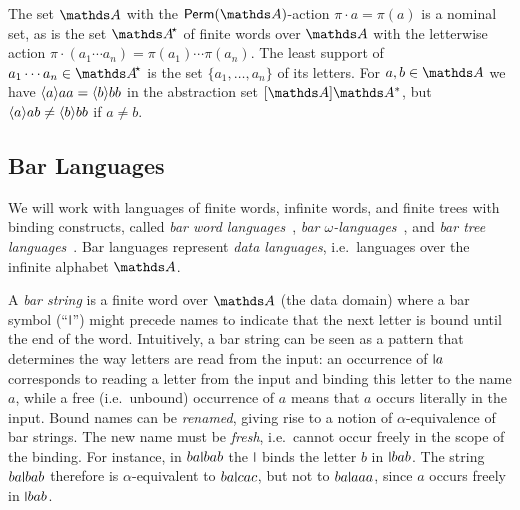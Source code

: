 \documentclass[a4paper,UKenglish,cleveref,autoref,thm-restate,numberwithinsect,final]{lipics-v2021}
\begin{document}
    \begin{expl}
        The set $\names$ with the $\Perm(\names)$-action $\pi\cdot a = \pi(a)$ is a nominal set, as is the set
        $\Ats$ of finite words over $\names$ with the letterwise action $\pi\cdot (a_1\cdots a_n) =\pi(a_1)\cdots\pi(a_n)$.
        The least support of $a_1\cdots a_n\in \Ats$ is the set $\{a_1,\ldots,a_n\}$ of its letters. For $a,b\in \names$ we have $\langle a \rangle aa=\langle b \rangle{bb}$ in the abstraction set $[\names]\names^*$, but $\langle a \rangle ab\neq \langle b \rangle bb$ if $a\neq b$.
    \end{expl}


\subsection{Bar Languages}
We will work with languages of finite words, infinite words, and finite trees with binding constructs, called \emph{bar word languages}~\cite{skmw17}, \emph{bar $\omega$-languages}~\cite{uhms21}, and \emph{bar tree languages}~\cite{ps24}. Bar languages represent \emph{data languages}, i.e.~languages over the infinite alphabet $\names$.

     A \emph{bar string} is a finite word over $\At$ (the data domain) where a bar symbol (\enquote{$\midmid$}) might precede names to indicate that the next letter is bound until the end of the word.
    Intuitively, a bar string can be seen as a pattern that determines the way letters are read from the input: an occurrence of $\newletter{a}$ corresponds to reading a letter from the input and binding this letter to the name $a$, while a free (i.e.~unbound) occurrence of $a$ means that $a$ occurs literally in the input.
    Bound names can be \emph{renamed}, giving rise to a notion of $\alpha$-equivalence of bar strings.
    The new name must be \emph{fresh}, i.e.~cannot occur freely in the scope of the binding.
    For instance, in $ba\newletter{b}ab$ the $\midmid$ binds the letter $b$ in $\newletter{b}ab$.
    The string $ba\newletter{b}ab$ therefore is $\alpha$-equivalent to $ba\newletter{c}ac$, but not to $ba\newletter{a}aa$, since $a$ occurs freely in $\newletter{b}ab$.
\end{document}
